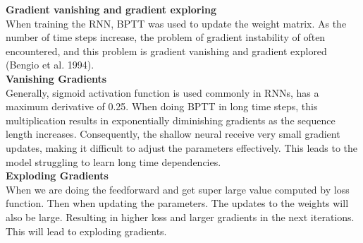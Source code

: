 \documentclass[12pt,a4paper]{article}
\begin{document}
\newpage
\textbf{Gradient vanishing and gradient exploring}
\\[1ex]
When training the RNN, BPTT was used to update the weight matrix. As the number of time steps increase, the problem of gradient instability of often encountered, and this problem is gradient vanishing and gradient explored (Bengio et al. 1994). 
\\[2ex]
\textbf{Vanishing Gradients}
\\[1ex]
Generally, sigmoid activation function is used commonly in RNNs, has a maximum derivative of 0.25. When doing BPTT in long time steps, this multiplication results in exponentially diminishing gradients as the sequence length increases. Consequently, the shallow neural receive very small gradient updates, making it difficult to adjust the parameters effectively. This leads to the model struggling to learn long time dependencies. 
\\[2ex]
\textbf{Exploding Gradients}
\\[1ex]
When we are doing the feedforward and get super large value computed by loss function. Then when updating the parameters. The updates to the weights will also be large. Resulting in higher loss and larger gradients in the next iterations. This will lead to exploding gradients.
\end{document}
